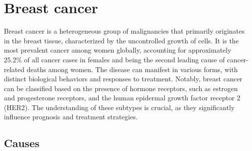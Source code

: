 \section{Breast cancer}
Breast cancer is a heterogeneous group of malignancies that primarily originates
in the breast tissue, characterized by the uncontrolled growth of cells. It is
the most prevalent cancer among women globally, accounting for approximately
25.2\% of all cancer cases in females and being the second leading cause of
cancer-related deaths among women\supercite{pace_breast_2016}. The disease can
manifest in various forms, with distinct biological behaviors and responses to
treatment. Notably, breast cancer can be classified based on the presence of
hormone receptors, such as estrogen and progesterone receptors, and the human
epidermal growth factor receptor 2 (HER2)\supercite{eccles_critical_2013}. The
understanding of these subtypes is crucial, as they significantly influence
prognosis and treatment strategies.

\subsection{Causes}